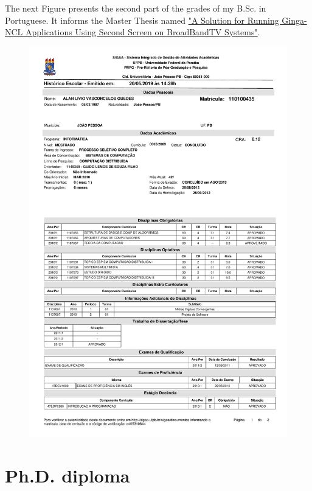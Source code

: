 \documentclass[10pt,a4paper,sans,colorlinks]{moderncv}
\begin{document}
\newpage
The next Figure presents the second part of the grades of my B.Sc. in Portuguese.
It informs the Master Thesis named \href{https://repositorio.ufpb.br/jspui/handle/tede/6087}{"A Solution for Running Ginga-NCL Applications Using Second Screen on BroadBandTV Systems"}.
\vspace{1em}
\begin{figure}
    \centering
    \includegraphics[align=t,width=\textwidth,height=0.75\textheight, keepaspectratio=true, page=2, trim=0cm 0cm 0cm 2cm]{certificates/msc-grades.pdf}
\end{figure}


\newpage
\section{Ph.D. diploma}
\end{document}
